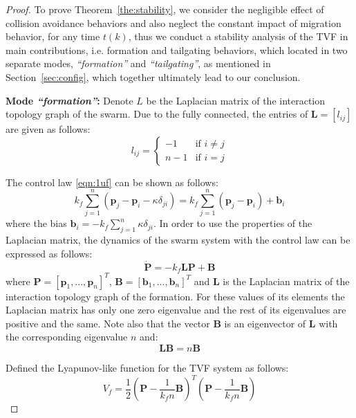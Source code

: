 \begin{proof}
To prove Theorem~\ref{the:stability}, we consider the negligible effect of collision avoidance behaviors and also neglect the constant impact of migration behavior, for any time $t(k)$, thus we conduct a stability analysis of the TVF in main contributions, i.e. formation and tailgating behaviors, which located in two separate modes, \textit{``formation''} and \textit{``tailgating''}, as mentioned in Section~\ref{sec:config}, which together ultimately lead to our conclusion.

\textbf{Mode \textit{``formation''}:} Denote $L$ be the Laplacian matrix of the interaction topology graph of the swarm. Due to the fully connected, the entries of $\mathbf{L}=\left[l_{ij}\right]$ are given as follows:
\begin{equation}
    l_{ij}=\begin{cases}
    -1 & \text{if }i\neq j \\
    n-1 & \text{if }i=j
    \end{cases}
\end{equation}

The control law \eqref{eqn:1uf} can be shown as follows:
\begin{equation}
    k_f\sum_{j=1}^n{\left(\mathbf{p}_j-\mathbf{p}_i-\kappa \delta_{ji}\right)}=k_f\sum_{j=1}^n{\left(\mathbf{p}_j-\mathbf{p}_i\right)}+\mathbf{b}_i
\end{equation}
where the bias $\mathbf{b}_i=-k_f\sum_{j=1}^n\kappa \delta_{ji}$.  In order to use the properties of the Laplacian matrix, the dynamics of the swarm system with the control law can be expressed as follows:
\begin{equation}
    \dot{\mathbf{P}}=-k_f\mathbf{L}\mathbf{P}+\mathbf{B}
\end{equation}
where $\mathbf{P}=\left[\mathbf{p}_1,...,\mathbf{p}_n\right]^T$, $\mathbf{B}=\left[\mathbf{b}_1,...,\mathbf{b}_n\right]^T$ and $\mathbf{L}$ is the Laplacian matrix of the interaction topology graph of the formation. For these values of its elements the Laplacian matrix has only one zero eigenvalue and the rest of its eigenvalues are positive and the same. Note also that the vector $\mathbf{B}$ is an eigenvector of $\mathbf{L}$ with the corresponding eigenvalue $n$ and:
\begin{equation}
    \mathbf{L}\mathbf{B}=n\mathbf{B}
\end{equation}

Defined the Lyapunov-like function for the TVF system as follows:
\begin{equation}
    V_f=\dfrac{1}{2}\left(\mathbf{P}-\dfrac{1}{k_fn}\mathbf{B}\right)^T\left(\mathbf{P}-\dfrac{1}{k_fn}\mathbf{B}\right)
\end{equation}


\end{proof}
